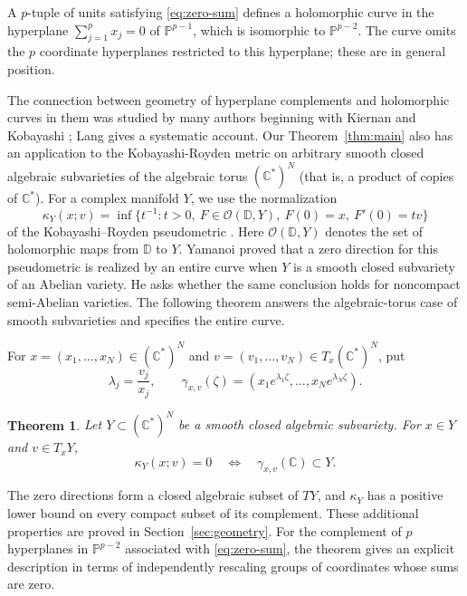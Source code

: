 \documentclass[12pt,letterpaper,reqno]{amsart}
\newtheorem{thm}{Theorem}[section]
\theoremstyle{definition}
\numberwithin{equation}{section}
\newcommand{\D}{\mathbb D}
\newcommand{\C}{\mathbb C}
\newcommand{\PP}{\mathbb P}
\newcommand{\OO}{\mathcal O}
\begin{document}
	
	A $p$-tuple of units satisfying \eqref{eq:zero-sum} defines a
	holomorphic curve in the hyperplane $\sum_{j=1}^p x_j=0$ of
	$\PP^{p-1}$, which is isomorphic to $\PP^{p-2}$.
	The curve omits the $p$ coordinate hyperplanes restricted to this
	hyperplane; these are in general position.
	
	The connection between geometry of hyperplane complements
	and holomorphic curves in them
	was studied by many authors
	beginning with Kiernan and
	Kobayashi \cite{KK73}; Lang \cite[Chapter~VIII]{Lan87} gives a
	systematic account. Our Theorem~\ref{thm:main} also has an application
	to the Kobayashi-Royden metric on
	arbitrary smooth closed algebraic subvarieties of the algebraic torus
	$(\C^*)^N$ (that is, a product of copies of $\C^*$). For a complex
	manifold $Y$, we use the normalization
	\[
	\kappa_Y(x;v)=\inf\{t^{-1}:t>0,\ F\in\OO(\D,Y),\
	F(0)=x,\ F'(0)=tv\}
	\]
	of the Kobayashi--Royden pseudometric \cite{Roy71}.
	Here $\OO(\D,Y)$ denotes the set of holomorphic maps from $\D$ to $Y$.
	Yamanoi  \cite[Theorem~1.5]{Yam26} proved that a zero direction for this pseudometric is realized
	by an entire curve when $Y$ is a smooth closed subvariety of an Abelian
	variety. He 	\cite[p.~459 and Remark~14.4 on p.~604]{Yam26} asks whether the same conclusion
	holds for noncompact semi-Abelian varieties. The following theorem answers
	the algebraic-torus case of smooth subvarieties and specifies the
	entire curve.
	
	For $x=(x_1,\ldots,x_N)\in(\C^*)^N$ and
	$v=(v_1,\ldots,v_N)\in T_x(\C^*)^N$, put
	\begin{equation*}
		\lambda_j=\frac{v_j}{x_j},\qquad
		\gamma_{x,v}(\zeta)=
		(x_1e^{\lambda_1\zeta},\ldots,x_Ne^{\lambda_N\zeta}).
	\end{equation*}
	
	\begin{thm}\label{thm:torus-zero}
		Let $Y\subset(\C^*)^N$ be a smooth closed algebraic subvariety.
		For $x\in Y$ and $v\in T_xY$,
		\[
		\kappa_Y(x;v)=0
		\quad\Longleftrightarrow\quad
		\gamma_{x,v}(\C)\subset Y.
		\]
	\end{thm}
	
	The zero directions form a closed algebraic subset of $TY$, and
	$\kappa_Y$ has a positive lower bound on every compact subset of its
	complement. These additional properties are proved in
	Section~\ref{sec:geometry}. For the complement of $p$ hyperplanes in
	$\mathbb P^{p-2}$ associated with \eqref{eq:zero-sum}, the theorem
	gives an explicit description in terms of independently rescaling
	groups of coordinates whose sums are zero.
	
\end{document}
